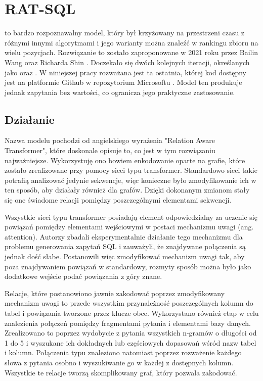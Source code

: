 \section{RAT-SQL}
 to bardzo rozpoznawalny model, który był krzyżowany na przestrzeni czasu z różnymi innymi algorytmami i jego warianty można znaleźć w rankingu zbioru  na wielu pozycjach. Rozwiązanie to zostało zaproponowane w 2021 roku przez Bailin Wang oraz Richarda Shin . Doczekało się dwóch kolejnych iteracji, określanych jako  oraz . W niniejszej pracy rozważana jest ta ostatnia, której kod dostępny jest na platformie Github w repozytorium Microsoftu . Model ten produkuje jednak zapytania bez wartości, co ogranicza jego praktyczne zastosowanie.

\subsection{Działanie}
Nazwa modelu  pochodzi od angielskiego wyrażenia "Relation Aware Transformer", które doskonale opisuje to, co jest w tym rozwiązaniu najważniejsze. Wykorzystuję ono bowiem enkodowanie oparte na grafie, które zostało zrealizowane przy pomocy sieci typu transformer. Standardowo sieci takie potrafią analizować jedynie sekwencje, więc konieczne było zmodyfikowanie ich w ten sposób, aby działały również dla grafów. Dzięki dokonanym zmianom stały się one świadome relacji pomiędzy poszczególnymi elementami sekwencji.

Wszystkie sieci typu transformer posiadają element odpowiedzialny za uczenie się powiązań pomiędzy elementami wejściowymi w postaci mechanizmu uwagi (ang. attention). Autorzy  zbadali eksperymentalnie działanie tego mechanizmu dla problemu generowania zapytań SQL i zauważyli, że znajdywane połączenia są jednak dość słabe. Postanowili więc zmodyfikować mechanizm uwagi tak, aby poza znajdywaniem powiązań w standardowy, rozmyty sposób można było jako dodatkowe wejście podać powiązania z góry znane. 

Relacje, które postanowiono jawnie zakodować poprzez zmodyfikowany mechanizm uwagi to przede wszystkim przynależność poszczególnych kolumn do tabel i powiązania tworzone przez klucze obce. Wykorzystano również etap  w celu znalezienia połączeń pomiędzy fragmentami pytania i elementami bazy danych. Zrealizowano to poprzez wydobycie z pytania wszystkich n-gramów o długości od 1 do 5 i wyszukane ich dokładnych lub częściowych dopasowań wśród nazw tabel i kolumn. Połączenia typu  znaleziono natomiast poprzez rozważenie każdego słowa z pytania osobno i wyszukiwanie go w każdej z dostępnych kolumn. Wszystkie te relacje tworzą skomplikowany graf, który  pozwala zakodować.

